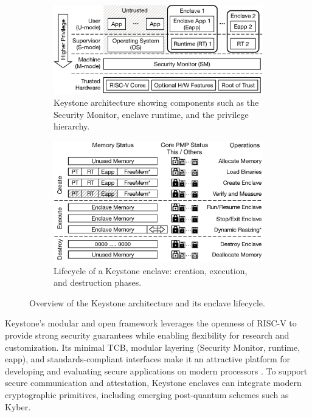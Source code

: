 \begin{figure}[htbp]
\centering
\begin{subfigure}[b]{0.9\linewidth}
    \centering
    \includegraphics[width=\linewidth]{figures/keystone_overview.png}
    \caption{Keystone architecture showing components such as the Security Monitor, enclave runtime, and the privilege hierarchy.}
    \label{fig:keystone_overview}
\end{subfigure}

\vspace{0.5cm}

\begin{subfigure}[b]{0.9\linewidth}
    \centering
    \includegraphics[width=\linewidth]{figures/enclave_lifecycle.png}
    \caption{Lifecycle of a Keystone enclave: creation, execution, and destruction phases.}
    \label{fig:enclave_lifecycle}
\end{subfigure}

\caption{Overview of the Keystone architecture and its enclave lifecycle.}
\label{fig:keystone_grouped}
\end{figure}

Keystone’s modular and open framework leverages the openness of RISC-V to provide strong security guarantees while enabling flexibility for research and customization. Its minimal TCB, modular layering (Security Monitor, runtime, eapp), and standards-compliant interfaces make it an attractive platform for developing and evaluating secure applications on modern processors \cite{Lee2019}. 
To support secure communication and attestation, Keystone enclaves can integrate modern cryptographic primitives, including emerging post-quantum schemes such as Kyber.

